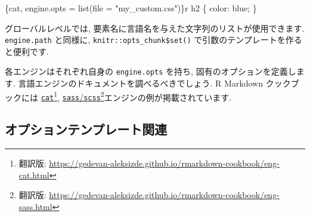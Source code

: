 \documentclass[
  lualatex,ja=standard,jafont=noto-otf]{bxjsreport}
\newenvironment{Shaded}{\begin{snugshade}}{\end{snugshade}}
\newcommand{\AttributeTok}[1]{\textcolor[rgb]{0.13,0.29,0.53}{#1}}
\newcommand{\FunctionTok}[1]{\textcolor[rgb]{0.13,0.29,0.53}{\textbf{#1}}}
\newcommand{\NormalTok}[1]{#1}
\newcommand{\SpecialCharTok}[1]{\textcolor[rgb]{0.81,0.36,0.00}{\textbf{#1}}}
\newcommand{\StringTok}[1]{\textcolor[rgb]{0.31,0.60,0.02}{#1}}
\begin{document}
\begin{itemize}
\begin{Shaded}
\begin{Highlighting}[numbers=left,,]
\NormalTok{\textasciigrave{}\textasciigrave{}\textasciigrave{}\{cat, engine.opts = list(file = "my\_custom.css")\}\textasciigrave{}r \textquotesingle{}\textquotesingle{}\textasciigrave{}}
\NormalTok{h2 \{}
\NormalTok{  color: blue;}
\NormalTok{\}}
\NormalTok{\textasciigrave{}\textasciigrave{}\textasciigrave{}}
\end{Highlighting}
\end{Shaded}

  グローバルレベルでは,
  要素名に言語名を与えた文字列のリストが使用できます.
  \texttt{engine.path} と同様に, \texttt{knitr::opts\_chunk\$set()}
  で引数のテンプレートを作ると便利です.

\begin{Shaded}
\end{Shaded}

  各エンジンはそれぞれ自身の \texttt{engine.opts} を持ち,
  固有のオプションを定義します.
  言語エンジンのドキュメントを調べるべきでしょう. R Markdown
  クックブックには
  \href{https://bookdown.org/yihui/rmarkdown-cookbook/eng-cat.html}{\texttt{cat}}\footnote{翻訳版:
    \url{https://gedevan-aleksizde.github.io/rmarkdown-cookbook/eng-cat.html}},
  \href{https://bookdown.org/yihui/rmarkdown-cookbook/eng-sass.html}{\texttt{sass}/\texttt{scss}}\footnote{翻訳版:
    \url{https://gedevan-aleksizde.github.io/rmarkdown-cookbook/eng-sass.html}}エンジンの例が掲載されています.
\end{itemize}

\hypertarget{ux30aaux30d7ux30b7ux30e7ux30f3ux30c6ux30f3ux30d7ux30ecux30fcux30c8ux95a2ux9023}{%
\subsection{オプションテンプレート関連}\label{ux30aaux30d7ux30b7ux30e7ux30f3ux30c6ux30f3ux30d7ux30ecux30fcux30c8ux95a2ux9023}}
\end{document}
